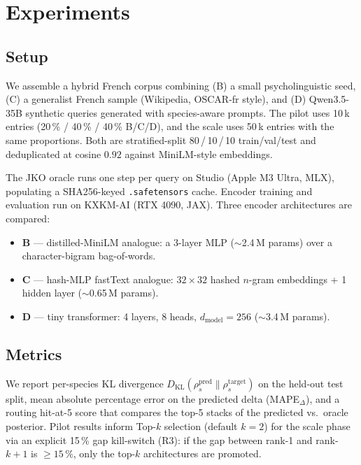 \section{Experiments}
\label{sec:experiments}

\subsection{Setup}

We assemble a hybrid French corpus combining (B) a small
psycholinguistic seed, (C) a generalist French sample (Wikipedia,
OSCAR-fr style), and (D) Qwen3.5-35B synthetic queries generated
with species-aware prompts. The pilot uses 10\,k entries
(20\,\% / 40\,\% / 40\,\% B/C/D), and the scale uses 50\,k entries
with the same proportions. Both are stratified-split
80\,/\,10\,/\,10 train/val/test and deduplicated at cosine $0.92$
against MiniLM-style embeddings.

The JKO oracle runs one step per query on Studio (Apple M3 Ultra,
MLX), populating a SHA256-keyed \texttt{.safetensors} cache.
Encoder training and evaluation run on KXKM-AI (RTX 4090, JAX).
Three encoder architectures are compared:

\begin{itemize}
    \item \textbf{B} --- distilled-MiniLM analogue: a 3-layer MLP
        ($\sim$2.4\,M params) over a character-bigram
        bag-of-words.
    \item \textbf{C} --- hash-MLP fastText analogue:
        $32 \times 32$ hashed $n$-gram embeddings + 1 hidden layer
        ($\sim$0.65\,M params).
    \item \textbf{D} --- tiny transformer: 4 layers, 8 heads,
        $d_{\mathrm{model}} = 256$ ($\sim$3.4\,M params).
\end{itemize}

\subsection{Metrics}

We report per-species KL divergence
$D_{\mathrm{KL}}(\rho^{\mathrm{pred}}_s \| \rho^{\mathrm{target}}_s)$
on the held-out test split, mean absolute percentage error on the
predicted delta (MAPE$_\Delta$), and a routing hit-at-5 score that
compares the top-5 stacks of the predicted vs.\ oracle posterior.
Pilot results inform Top-$k$ selection (default $k = 2$) for the
scale phase via an explicit 15\,\% gap kill-switch (R3): if the
gap between rank-1 and rank-$k{+}1$ is $\geq 15\,\%$, only the
top-$k$ architectures are promoted.

